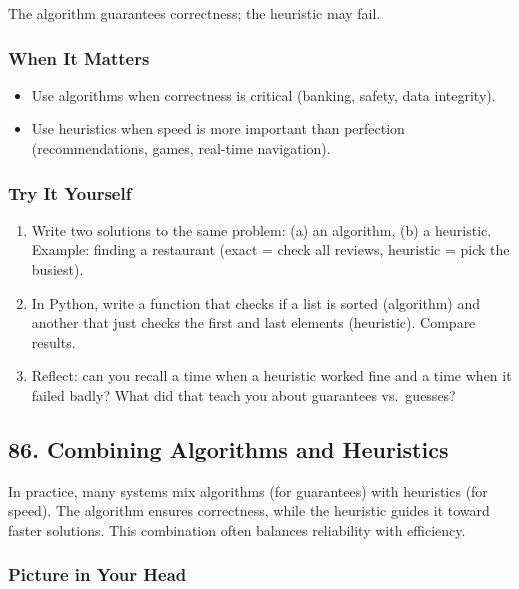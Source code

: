 \documentclass[
  letterpaper,
  DIV=11,
  numbers=noendperiod]{scrreprt}
\providecommand{\tightlist}{%
  \setlength{\itemsep}{0pt}\setlength{\parskip}{0pt}}
\begin{document}
The algorithm guarantees correctness; the heuristic may fail.

\subsubsection{When It Matters}\label{when-it-matters-83}

\begin{itemize}
\tightlist
\item
  Use algorithms when correctness is critical (banking, safety, data
  integrity).
\item
  Use heuristics when speed is more important than perfection
  (recommendations, games, real-time navigation).
\end{itemize}

\subsubsection{Try It Yourself}\label{try-it-yourself-85}

\begin{enumerate}
\def\labelenumi{\arabic{enumi}.}
\tightlist
\item
  Write two solutions to the same problem: (a) an algorithm, (b) a
  heuristic. Example: finding a restaurant (exact = check all reviews,
  heuristic = pick the busiest).
\item
  In Python, write a function that checks if a list is sorted
  (algorithm) and another that just checks the first and last elements
  (heuristic). Compare results.
\item
  Reflect: can you recall a time when a heuristic worked fine and a time
  when it failed badly? What did that teach you about guarantees
  vs.~guesses?
\end{enumerate}

\subsection{86. Combining Algorithms and
Heuristics}\label{combining-algorithms-and-heuristics}

In practice, many systems mix algorithms (for guarantees) with
heuristics (for speed). The algorithm ensures correctness, while the
heuristic guides it toward faster solutions. This combination often
balances reliability with efficiency.

\subsubsection{Picture in Your Head}\label{picture-in-your-head-86}
\end{document}
